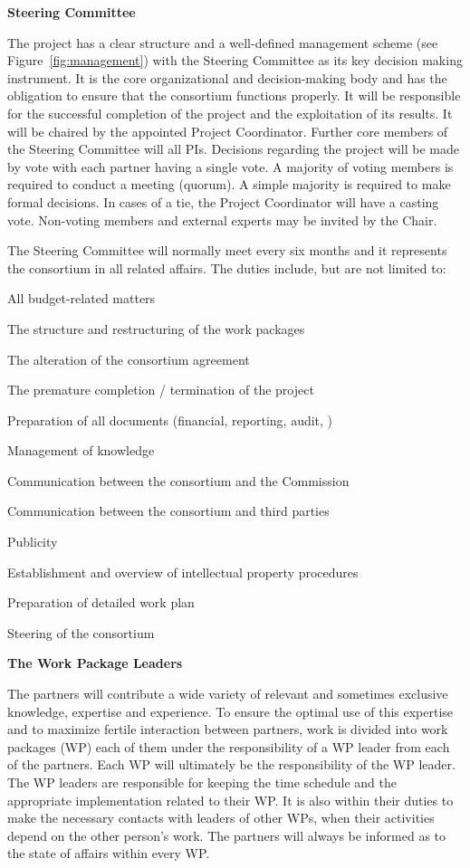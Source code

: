 {\bf Steering Committee}
\label{sec:mngt:ga}

The \Project{} project has a clear structure and a well-defined
management scheme (see Figure~\ref{fig:management}) with the Steering
Committee as its key decision making instrument.  It is the core
organizational and decision-making body and has the obligation to
ensure that the consortium functions properly.  It will be responsible
for the successful completion of the project and the exploitation of
its results.  It will be chaired by the appointed Project
Coordinator. Further core members of the Steering Committee will
all PIs.  Decisions regarding the project will be made by vote with
each partner having a single vote. A majority of voting members is
required to conduct a meeting (quorum). A simple majority is required
to make formal decisions.  In cases of a tie, the Project Coordinator
will have a casting vote.  Non-voting members and external experts may
be invited by the Chair.

The Steering Committee will normally meet every six months and it
represents the consortium in all related affairs. The duties include,
but are not limited to:
\begin{denseItemize}
\item All budget-related matters
\item The structure and restructuring of the work packages
\item The alteration of the consortium agreement
\item The premature completion / termination of the project
\item Preparation of all documents (financial, reporting, audit, \etc)
\item Management of knowledge
\item Communication between the consortium and the Commission
\item Communication between the consortium and third parties
\item Publicity
\item Establishment and overview of intellectual property procedures
\item Preparation of detailed work plan
\item Steering of the consortium
\end{denseItemize}


\vspace{3mm}
{\bf The Work Package Leaders}

The \Project{} partners will contribute a wide variety of relevant and
sometimes exclusive knowledge, expertise and experience. To ensure the
optimal use of this expertise and to maximize fertile interaction
between partners, work is divided into work packages (WP) each of them
under the responsibility of a WP leader from each of the
partners. Each WP will ultimately be the responsibility of the WP
leader. The WP leaders are responsible for keeping the time schedule
and the appropriate implementation related to their WP. It is also
within their duties to make the necessary contacts with leaders of
other WPs, when their activities depend on the other person's
work. The \Project{} partners will always be informed as to the state
of affairs within every WP.

